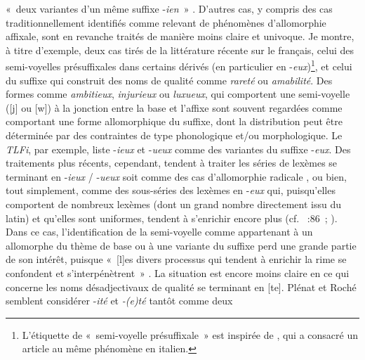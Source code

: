 \documentclass[output=paper]{langsci/langscibook}
\begin{document}
«~deux variantes d'un même suffixe -\emph{ien}~» %
\citep[191]{LignonStephanie2011}%
%
. D'autres cas, y compris des cas traditionnellement identifiés
comme relevant de phénomènes d'allomorphie affixale, sont en revanche
traités de manière moins claire et univoque. Je montre, à titre
d'exemple, deux cas tirés de la littérature récente sur le français,
celui des semi-voyelles présuffixales dans certains dérivés (en
particulier en -\emph{eux})\footnote{L'étiquette de «~semi-voyelle
  présuffixale~» est inspirée de %
\citet{Thornton1999}%
%
, qui a consacré un article
  au même phénomène en italien.}, et celui du suffixe qui construit des
noms de qualité comme \emph{rareté} ou \emph{amabilité}. Des formes
comme \emph{ambitieux}, \emph{injurieux} ou \emph{luxueux}, qui
comportent une semi-voyelle ({[}j{]} ou {[}w{]}) à la jonction entre la
base et l'affixe sont souvent regardées comme comportant une forme
allomorphique du suffixe, dont la distribution peut être déterminée par
des contraintes de type phonologique et/ou morphologique. Le \emph{TLFi}, par
exemple, liste -\emph{ieux} et -\emph{ueux} comme des variantes du
suffixe -\emph{eux}. Des traitements plus récents, cependant, tendent à
traiter les séries de lexèmes se terminant en -\emph{ieux} /
-\emph{ueux} soit comme des cas d'allomorphie radicale %
\citep[celle-ci semble être la position exprimée par][104-105]{Bonami2009b}%
%
, ou bien,
tout simplement, comme des sous-séries des lexèmes en -\emph{eux} qui,
puisqu'elles comportent de nombreux lexèmes (dont un grand nombre
directement issu du latin) et qu'elles sont uniformes, tendent à
s'enrichir encore plus %
(cf. \citealt{Roche2011b}~:86~; \citealt{roche2014.CMLF}).
Dans ce cas, l'identification de la semi-voyelle comme appartenant à un
allomorphe du thème de base ou à une variante du suffixe perd une grande
partie de son intérêt, puisque «~{[}l{]}es divers processus qui tendent
à enrichir la rime se confondent et s'interpénètrent~» %
\citep[1867]{roche2014.CMLF}%
%
%
. La situation est encore moins claire en ce qui concerne
les noms désadjectivaux de qualité se terminant en {[}te{]}. Plénat et
Roché semblent considérer -\emph{ité} et \emph{-(e)té} tantôt comme deux
\end{document}
